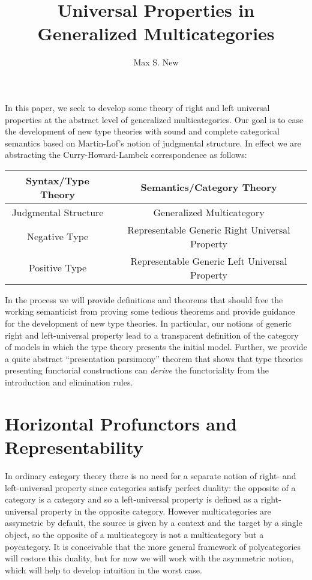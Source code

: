 \documentclass{article}
\begin{document}
\newtheorem{theorem}{Theorem}
\newtheorem{definition}{Definition}
\newcommand{\pto}{\nrightarrow}
\newcommand{\pfrom}{\nleftarrow}
\newcommand{\vcat}{\mathcal}
\newcommand{\cat}{\mathbb}

\title{Universal Properties in Generalized Multicategories}
\author{Max S. New}

\maketitle

In this paper, we seek to develop some theory of right and left
universal properties at the abstract level of generalized
multicategories.
%
Our goal is to ease the development of new type theories with sound
and complete categorical semantics based on Martin-Lof's notion of
judgmental structure.
%
In effect we are abstracting the Curry-Howard-Lambek correspondence as
follows:

\begin{tabular}{|c|c|}
  \hline
  Syntax/Type Theory & Semantics/Category Theory\\ \hline \hline
  Judgmental Structure & Generalized Multicategory\\ \hline
  Negative Type & Representable Generic Right Universal Property\\ \hline
  Positive Type & Representable Generic Left Universal Property\\ \hline  
\end{tabular}

In the process we will provide definitions and theorems that should
free the working semanticist from proving some tedious theorems and
provide guidance for the development of new type theories.
%
In particular, our notions of generic right and left-universal
property lead to a transparent definition of the category of models in
which the type theory presents the initial model.
Further, we provide a quite abstract ``presentation parsimony''
theorem that shows that type theories presenting functorial
constructions can \emph{derive} the functoriality from the
introduction and elimination rules.

\section{Horizontal Profunctors and Representability}

In ordinary category theory there is no need for a separate notion of
right- and left-universal property since categories satisfy perfect
duality: the opposite of a category is a category and so a
left-universal property is defined as a right-universal property in
the opposite category.
%
However multicategories are assymetric by default, the source is given
by a context and the target by a single object, so the opposite of a
multicategory is not a multicategory but a poycategory.
%
It is conceivable that the more general framework of polycategories
will restore this duality, but for now we will work with the
asymmetric notion, which will help to develop intuition in the worst
case.
\end{document}
